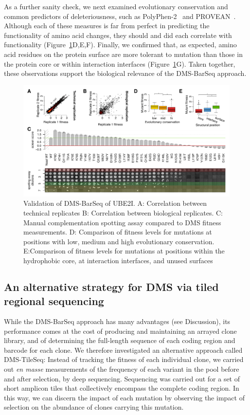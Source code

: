 As a further sanity check, we next examined evolutionary conservation and common predictors of deleteriousness, such as PolyPhen-2~\cite{adzhubei_predicting_2001} and PROVEAN~\cite{choi_predicting_2012}.  Although each of these measures is far from perfect in predicting the functionality of amino acid changes, they should and did each correlate with functionality (Figure~\ref{fig:barseqValidation}D,E,F). Finally, we confirmed that, as expected, amino acid residues on the protein surface are more tolerant to mutation than those in the protein core or within interaction interfaces (Figure~\ref{fig:barseqValidation}G).  Taken together, these observations support the biological relevance of the DMS-BarSeq approach.

\begin{landscape}
\begin{figure}
	\centering
	\includegraphics[width=9in]{img/barseq-validation.pdf}
	\caption{Validation of DMS-BarSeq of UBE2I. A: Correlation between technical replicates B: Correlation between biological replicates. C: Manual complementation spotting assay compared to DMS fitness measurements. D: Comparison of fitness levels for mutations at positions with low, medium and high evolutionary conservation. E:Comparison of fitness levels for mutations at positions within the hydrophobic core, at interaction interfaces, and unused surfaces}
	\label{fig:barseqValidation}
\end{figure}
\end{landscape}


\subsection{An alternative strategy for DMS via tiled regional sequencing}

While the DMS-BarSeq approach has many advantages (see Discussion), its performance comes at the cost of producing and maintaining an arrayed clone library, and of determining the full-length sequence of each coding region and barcode for each clone. We therefore investigated an alternative approach called DMS-TileSeq: Instead of tracking the fitness of each individual clone, we carried out \textit{en masse} measurements of the frequency of each variant in the pool before and after selection, by deep sequencing.  Sequencing was carried out for a set of short amplicon tiles that collectively encompass the complete coding region.  In this way, we can discern the impact of each mutation by observing the impact of selection on the abundance of clones carrying this mutation.

